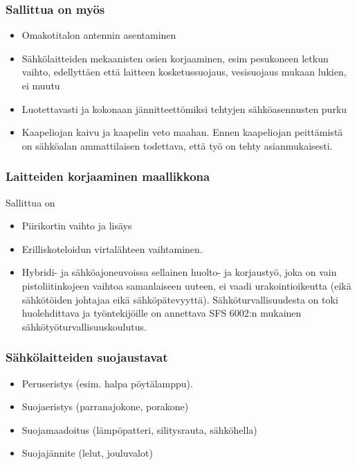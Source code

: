 \begin{frame}
\frametitle{Sallittua on myös}
\begin{itemize}
\item    Omakotitalon antennin asentaminen
\item    Sähkölaitteiden mekaanisten osien korjaaminen, esim pesukoneen letkun vaihto, edellyttäen että laitteen kosketussuojaus, vesisuojaus mukaan lukien, ei muutu
\item    Luotettavasti ja kokonaan jännitteettömiksi tehtyjen sähköasennusten purku
\item    Kaapeliojan kaivu ja kaapelin veto maahan. Ennen kaapeliojan peittämistä on sähköalan ammattilaisen todettava, että työ on tehty asianmukaisesti.
\end{itemize}
\end{frame}

\begin{frame}
\frametitle{Laitteiden korjaaminen maallikkona}
Sallittua on
\begin{itemize}
\item Piirikortin vaihto ja lisäys %
\item Erilliskoteloidun virtalähteen vaihtaminen.
\item Hybridi- ja sähköajoneuvoissa sellainen huolto- ja korjaustyö, joka on vain pistoliitinkojeen vaihtoa samanlaiseen uuteen, ei vaadi urakointioikeutta (eikä sähkötöiden johtajaa eikä sähköpätevyyttä). Sähköturvallisuudesta on toki huolehdittava ja työntekijöille on annettava SFS 6002:n mukainen sähkötyöturvallisuuskoulutus. %
\end{itemize}
\end{frame}

\begin{frame}
\frametitle{Sähkölaitteiden suojaustavat}
\begin{itemize}
\item Peruseristys (esim. halpa pöytälamppu).
\item Suojaeristys (parranajokone, porakone)
\item Suojamaadoitus (lämpöpatteri, silitysrauta, sähköhella)
\item Suojajännite (lelut, jouluvalot)
\end{itemize}
\end{frame}

